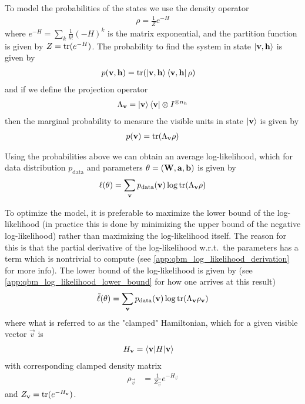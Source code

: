 To model the probabilities of the states we use the density operator
\begin{align}
    \rho = \frac{1}{Z} e^{-H}
\end{align}
where \( e^{-H} = \sum_k \frac{1}{k!} (-H)^k \) is the matrix exponential, and the partition function is given by \( Z = \text{tr}(e^{-H}) \).
The probability to find the system in state \( \ket{\mathbf{v},\mathbf{h}} \) is given by
\begin{align}
    p(\mathbf{v},\mathbf{h})
        &= \text{tr}(\ket{\mathbf{v},\mathbf{h}}\bra{\mathbf{v},\mathbf{h}} \rho)
\end{align}
and if we define the projection operator
\begin{align}
    \Lambda_{\mathbf{v}} = \ket{\mathbf{v}}\bra{\mathbf{v}} \otimes I^{\otimes n_h}
\end{align}
then the marginal probability to measure the visible units in state \( \ket{\mathbf{v}} \) is given by
\begin{align}
    p(\mathbf{v}) = \text{tr}(\Lambda_{\mathbf{v}}\rho)
\end{align}

Using the probabilities above we can obtain an average log-likelihood, which for data distribution \( p_\text{data} \) and parameters \( \theta = (\mathbf{W}, \mathbf{a}, \mathbf{b}) \) is given by
\begin{align}
    \ell(\theta) = \sum_{\mathbf{v}} p_{\text{data}}(\mathbf{v}) \log \text{tr}(\Lambda_{\mathbf{v}}\rho)
\end{align}

To optimize the model, it is preferable to maximize the lower bound of the log-likelihood (in practice this is done by minimizing the upper bound of the negative log-likelihood) rather than maximizing the log-likelihood itself.
The reason for this is that the partial derivative of the log-likelihood w.r.t.\ the parameters has a term which is nontrivial to compute (see \cref{app:qbm_log_likelihood_derivation} for more info).
The lower bound of the log-likelihood is given by (see \cref{app:qbm_log_likelihood_lower_bound} for how one arrives at this result)
\begin{align}
    \tilde{\ell}(\theta) = \sum_{\mathbf{v}} p_{\text{data}}(\mathbf{v}) \log \text{tr}(\Lambda_{\mathbf{v}}\rho_{\mathbf{v}})
\end{align}
where what is referred to as the "clamped" Hamiltonian, which for a given visible vector \( \vec{v} \) is
\begin{align}
    H_{\mathbf{v}}
        &= \braket{\mathbf{v}|H|\mathbf{v}}
\end{align}
with corresponding clamped density matrix
\begin{align}
    \rho_\vec{v}
        &= \frac{1}{Z_\vec{v}} e^{-H_\vec{v}}
\end{align}
and \( Z_{\mathbf{v}} = \text{tr}(e^{-H_{\mathbf{v}}}) \).

